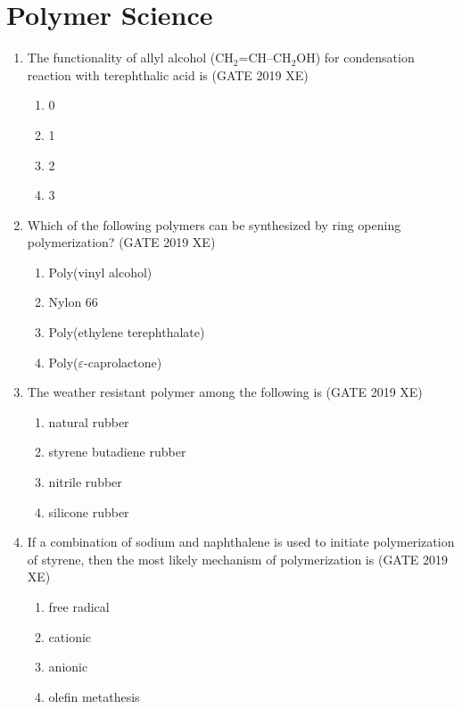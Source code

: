 \documentclass[journal,12pt,onecolumn]{IEEEtran}
\begin{document}
\section*{Polymer Science}
\noindent
\bigskip
\begin{enumerate}

\item The functionality of allyl alcohol (CH$_2$=CH--CH$_2$OH) for condensation reaction with terephthalic acid is
\hfill{(GATE 2019 XE)} \\
\begin{multicols}{2}
\begin{enumerate}
\item 0
\item 1
\item 2
\item 3
\end{enumerate}
\end{multicols}

\item Which of the following polymers can be synthesized by ring opening polymerization?
\hfill{(GATE 2019 XE)} \\
\begin{multicols}{2}
\begin{enumerate}
\item Poly(vinyl alcohol)
\item Nylon 66
\item Poly(ethylene terephthalate)
\item Poly($\varepsilon$-caprolactone)
\end{enumerate}
\end{multicols}


\item The weather resistant polymer among the following is
\hfill{(GATE 2019 XE)} \\
\begin{multicols}{2}
\begin{enumerate}
\item natural rubber
\item styrene butadiene rubber
\item nitrile rubber
\item silicone rubber
\end{enumerate}
\end{multicols}

\item If a combination of sodium and naphthalene is used to initiate polymerization of styrene, then the most likely mechanism of polymerization is
\hfill{(GATE 2019 XE)} \\
\begin{multicols}{2}
\begin{enumerate}
\item free radical
\item cationic
\item anionic
\item olefin metathesis
\end{enumerate}
\end{multicols}


\end{enumerate}
\end{document}
